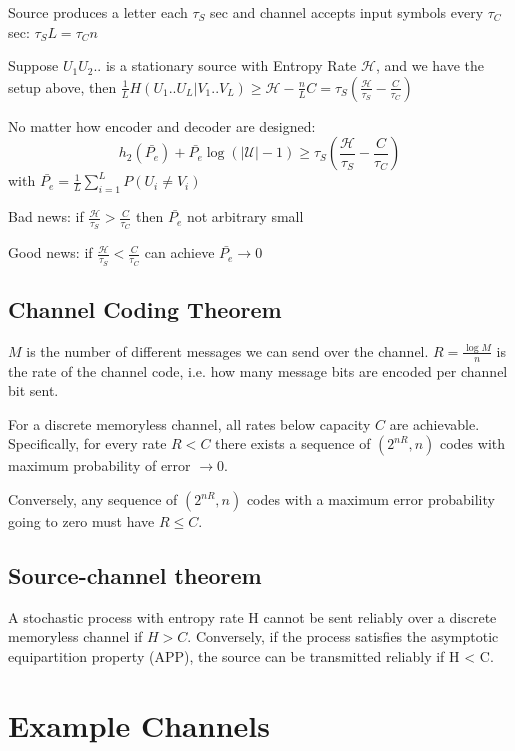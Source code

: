\documentclass[10pt,a4paper,landscape]{article}
\begin{document}
\begin{multicols*}{4}
Source produces a letter each $\tau_S$ sec and channel accepts input symbols every $\tau_C$ sec: $\tau_S L = \tau_C n$

Suppose $U_1U_2..$ is a stationary source with Entropy Rate $\mathcal{H}$, and we have the setup above, then $\frac{1}{L} H(U_1..U_L|V_1..V_L) \geq \mathcal{H} - \frac{n}{L}C = \tau_S\left(\frac{\mathcal{H}}{\tau_S}-\frac{C}{\tau_C}\right)$

No matter how encoder and decoder are designed:
$$ h_2(\bar{P_e}) + \bar{P_e}\log(|\mathcal{U}|-1) \geq \tau_S \left(\frac{\mathcal{H}}{\tau_S}-\frac{C}{\tau_C}\right)$$ with $\bar{P_e} = \frac{1}{L} \sum_{i=1}^L P(U_i \neq V_i)$

Bad news: if $\frac{\mathcal{H}}{\tau_S} > \frac{C}{\tau_C}$ then $\bar{P_e}$ not arbitrary small

Good news: if $\frac{\mathcal{H}}{\tau_S} < \frac{C}{\tau_C}$ can achieve $\bar{P_e} \rightarrow 0$

\subsection{Channel Coding Theorem}
$M$ is the number of different messages we can send over the channel.
$R = \frac{\log M}{n}$ is the rate of the channel code, i.e. how many message bits are encoded per channel bit sent.

For a discrete memoryless channel, all rates below capacity $C$ are achievable. Specifically, for every rate $R < C$ there exists a sequence of $(2^{nR}, n)$ codes with maximum probability of error $\rightarrow 0$.

Conversely, any sequence of $(2^{nR}, n)$ codes with a maximum error probability going to zero must have $R \leq C$.

\subsection{Source-channel theorem}
A stochastic process with entropy rate H cannot be sent reliably over a discrete memoryless channel if $H > C$. Conversely, if the process satisfies the asymptotic equipartition property (APP), the source can be transmitted reliably if H < C.

\section{Example Channels}

\end{multicols*}
\end{document}
